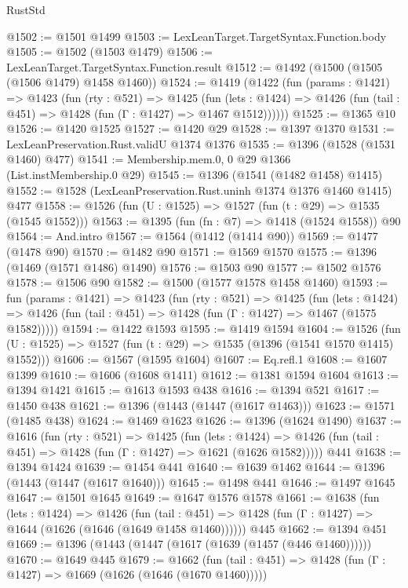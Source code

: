 \begin{lexlean}{RustStd}
\begin{coremodule}
{\begin{coremodule}
{{{{{{{{{{{@1502 := @1501 @1499
@1503 := LexLeanTarget.TargetSyntax.Function.body
@1505 := @1502 (@1503 @1479)
@1506 := LexLeanTarget.TargetSyntax.Function.result
@1512 := @1492 (@1500 (@1505 (@1506 @1479) @1458 @1460))
@1524 := @1419
    (@1422
      (fun (params : @1421) =>
      @1423
        (fun (rty : @521) =>
        @1425
          (fun (lets : @1424) =>
          @1426 (fun (tail : @451) => @1428 (fun (Γ : @1427) => @1467 @1512))))))
@1525 := @1365 @10
@1526 := @1420 @1525
@1527 := @1420 @29
@1528 := @1397 @1370
@1531 := LexLeanPreservation.Rust.validU @1374 @1376
@1535 := @1396 (@1528 (@1531 @1460) @477)
@1541 := Membership.mem.{0, 0} @29 @1366 (List.instMembership.{0} @29)
@1545 := @1396 (@1541 (@1482 @1458) @1415)
@1552 := @1528 (LexLeanPreservation.Rust.uninh @1374 @1376 @1460 @1415) @477
@1558 := @1526 (fun (U : @1525) => @1527 (fun (t : @29) => @1535 (@1545 @1552)))
@1563 := @1395 (fun (fn : @7) => @1418 (@1524 @1558)) @90
@1564 := And.intro
@1567 := @1564 (@1412 (@1414 @90))
@1569 := @1477 (@1478 @90)
@1570 := @1482 @90
@1571 := @1569 @1570
@1575 := @1396 (@1469 (@1571 @1486) @1490)
@1576 := @1503 @90
@1577 := @1502 @1576
@1578 := @1506 @90
@1582 := @1500 (@1577 @1578 @1458 @1460)
@1593 := fun (params : @1421) =>
  @1423
    (fun (rty : @521) =>
    @1425
      (fun (lets : @1424) =>
      @1426 (fun (tail : @451) => @1428 (fun (Γ : @1427) => @1467 (@1575 @1582)))))
@1594 := @1422 @1593
@1595 := @1419 @1594
@1604 := @1526 (fun (U : @1525) => @1527 (fun (t : @29) => @1535 (@1396 (@1541 @1570 @1415) @1552)))
@1606 := @1567 (@1595 @1604)
@1607 := Eq.refl.{1}
@1608 := @1607 @1399
@1610 := @1606 (@1608 @1411)
@1612 := @1381 @1594 @1604
@1613 := @1394 @1421
@1615 := @1613 @1593 @438
@1616 := @1394 @521
@1617 := @1450 @438
@1621 := @1396 (@1443 (@1447 (@1617 @1463)))
@1623 := @1571 (@1485 @438)
@1624 := @1469 @1623
@1626 := @1396 (@1624 @1490)
@1637 := @1616
    (fun (rty : @521) =>
    @1425
      (fun (lets : @1424) =>
      @1426 (fun (tail : @451) => @1428 (fun (Γ : @1427) => @1621 (@1626 @1582)))))
    @441
@1638 := @1394 @1424
@1639 := @1454 @441
@1640 := @1639 @1462
@1644 := @1396 (@1443 (@1447 (@1617 @1640)))
@1645 := @1498 @441
@1646 := @1497 @1645
@1647 := @1501 @1645
@1649 := @1647 @1576 @1578
@1661 := @1638
    (fun (lets : @1424) =>
    @1426
      (fun (tail : @451) => @1428 (fun (Γ : @1427) => @1644 (@1626 (@1646 (@1649 @1458 @1460))))))
    @445
@1662 := @1394 @451
@1669 := @1396 (@1443 (@1447 (@1617 (@1639 (@1457 (@446 @1460))))))
@1670 := @1649 @445
@1679 := @1662
    (fun (tail : @451) => @1428 (fun (Γ : @1427) => @1669 (@1626 (@1646 (@1670 @1460)))))
}}}}}}}}}}}
\end{coremodule}}
\end{coremodule}
\end{lexlean}
